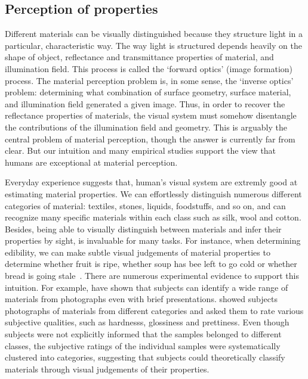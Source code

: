 \subsection{Perception of properties}
Different materials can be visually distinguished because they structure light in a particular, characteristic way. The way light is structured depends heavily on the shape of object, reflectance and transmittance properties of material, and illumination field. This process is called the `forward optics' (image formation) process. The material perception problem is, in some sense, the `inverse optics' problem: determining what combination of surface geometry, surface material, and illumination field generated a given image. Thus, in order to recover the reflectance properties of materials, the visual system must somehow disentangle the contributions of the illumination field and geometry. This is arguably the central problem of material perception, though the answer is currently far from clear. But our intuition and many empirical studies support the view that humans are exceptional at material perception.

Everyday experience suggests that, human's visual system are extremly good at estimating material properties. We can effortlessly distinguish numerous different categories of material: textiles, stones, liquids, foodstuffs, and so on, and can recognize many specific materials within each class such as silk, wool and cotton. Besides, being able to visually distinguish between materials and infer their properties by sight, is invaluable for many tasks. For instance, when determining edibility, we can make subtle visual judgements of material properties to determine whether fruit is ripe, whether soup has bee left to go cold or whether bread is going stale~\cite{fleming2014visual}. There are numerous experimental evidence to support this intuition. For example, \citeauthor{sharan2009material} have shown that subjects can identify a wide range of materials from photographs even with brief presentations. \citeauthor{fleming2013perceptual} showed subjects photographs of materials from different categories and asked them to rate various subjective qualities, such as hardnesss, glossiness and prettiness. Even though subjects were not explicitly informed that the samples belonged to different classes, the subjective ratings of the individual samples were systematically clustered into categories, suggesting that subjects could theoretically classify materials through visual judgements of their properties.

